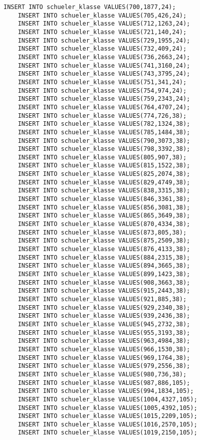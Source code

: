 \begin{lstlisting}[breaklines=True, numbers=none, basicstyle=\tiny, keepspaces=false]
	INSERT INTO schueler_klasse VALUES(700,1877,24);
	INSERT INTO schueler_klasse VALUES(705,426,24);
	INSERT INTO schueler_klasse VALUES(712,1263,24);
	INSERT INTO schueler_klasse VALUES(721,140,24);
	INSERT INTO schueler_klasse VALUES(729,1955,24);
	INSERT INTO schueler_klasse VALUES(732,409,24);
	INSERT INTO schueler_klasse VALUES(736,2663,24);
	INSERT INTO schueler_klasse VALUES(741,3160,24);
	INSERT INTO schueler_klasse VALUES(743,3795,24);
	INSERT INTO schueler_klasse VALUES(751,341,24);
	INSERT INTO schueler_klasse VALUES(754,974,24);
	INSERT INTO schueler_klasse VALUES(759,2343,24);
	INSERT INTO schueler_klasse VALUES(764,4707,24);
	INSERT INTO schueler_klasse VALUES(774,726,38);
	INSERT INTO schueler_klasse VALUES(782,1324,38);
	INSERT INTO schueler_klasse VALUES(785,1484,38);
	INSERT INTO schueler_klasse VALUES(790,3073,38);
	INSERT INTO schueler_klasse VALUES(798,3392,38);
	INSERT INTO schueler_klasse VALUES(805,907,38);
	INSERT INTO schueler_klasse VALUES(815,1522,38);
	INSERT INTO schueler_klasse VALUES(825,2074,38);
	INSERT INTO schueler_klasse VALUES(829,4749,38);
	INSERT INTO schueler_klasse VALUES(838,3315,38);
	INSERT INTO schueler_klasse VALUES(846,3361,38);
	INSERT INTO schueler_klasse VALUES(856,3081,38);
	INSERT INTO schueler_klasse VALUES(865,3649,38);
	INSERT INTO schueler_klasse VALUES(870,4334,38);
	INSERT INTO schueler_klasse VALUES(873,805,38);
	INSERT INTO schueler_klasse VALUES(875,2509,38);
	INSERT INTO schueler_klasse VALUES(876,4133,38);
	INSERT INTO schueler_klasse VALUES(884,2315,38);
	INSERT INTO schueler_klasse VALUES(894,3665,38);
	INSERT INTO schueler_klasse VALUES(899,1423,38);
	INSERT INTO schueler_klasse VALUES(908,3663,38);
	INSERT INTO schueler_klasse VALUES(915,2443,38);
	INSERT INTO schueler_klasse VALUES(921,885,38);
	INSERT INTO schueler_klasse VALUES(929,2340,38);
	INSERT INTO schueler_klasse VALUES(939,2436,38);
	INSERT INTO schueler_klasse VALUES(945,2732,38);
	INSERT INTO schueler_klasse VALUES(955,3193,38);
	INSERT INTO schueler_klasse VALUES(963,4984,38);
	INSERT INTO schueler_klasse VALUES(966,1530,38);
	INSERT INTO schueler_klasse VALUES(969,1764,38);
	INSERT INTO schueler_klasse VALUES(979,2556,38);
	INSERT INTO schueler_klasse VALUES(980,736,38);
	INSERT INTO schueler_klasse VALUES(987,886,105);
	INSERT INTO schueler_klasse VALUES(994,1834,105);
	INSERT INTO schueler_klasse VALUES(1004,4327,105);
	INSERT INTO schueler_klasse VALUES(1005,4392,105);
	INSERT INTO schueler_klasse VALUES(1015,2209,105);
	INSERT INTO schueler_klasse VALUES(1016,2570,105);
	INSERT INTO schueler_klasse VALUES(1019,2150,105);

\end{lstlisting}
